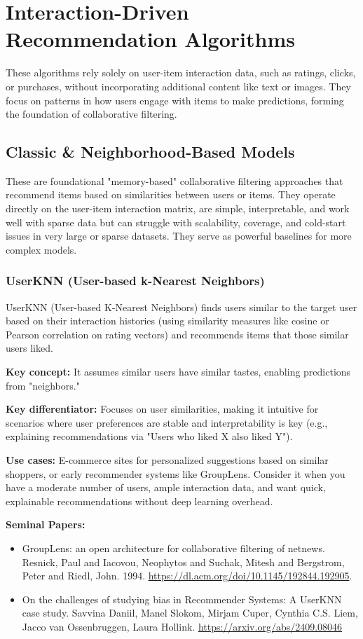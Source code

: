 \documentclass{article}
\begin{document}
    \section{Interaction-Driven Recommendation Algorithms}
    These algorithms rely solely on user-item interaction data, such as ratings, clicks, or purchases, without incorporating additional content like text or images. They focus on patterns in how users engage with items to make predictions, forming the foundation of collaborative filtering.

    \subsection{Classic \& Neighborhood-Based Models}
    These are foundational "memory-based" collaborative filtering approaches that recommend items based on similarities between users or items. They operate directly on the user-item interaction matrix, are simple, interpretable, and work well with sparse data but can struggle with scalability, coverage, and cold-start issues in very large or sparse datasets. They serve as powerful baselines for more complex models.

    \subsubsection{UserKNN (User-based k-Nearest Neighbors)}
    UserKNN (User-based K-Nearest Neighbors) finds users similar to the target user based on their interaction histories (using similarity measures like cosine or Pearson correlation on rating vectors) and recommends items that those similar users liked. 

\noindent\textbf{Key concept:} It assumes similar users have similar tastes, enabling predictions from "neighbors." 

\noindent\textbf{Key differentiator:} Focuses on user similarities, making it intuitive for scenarios where user preferences are stable and interpretability is key (e.g., explaining recommendations via "Users who liked X also liked Y"). 

\noindent\textbf{Use cases:} E-commerce sites for personalized suggestions based on similar shoppers, or early recommender systems like GroupLens. Consider it when you have a moderate number of users, ample interaction data, and want quick, explainable recommendations without deep learning overhead.

\noindent\textbf{Seminal Papers:}
    \begin{itemize}
        \item GroupLens: an open architecture for collaborative filtering of netnews. Resnick, Paul and Iacovou, Neophytos and Suchak, Mitesh and Bergstrom, Peter and Riedl, John. 1994. \url{https://dl.acm.org/doi/10.1145/192844.192905}.
        \item On the challenges of studying bias in Recommender Systems: A UserKNN case study. Savvina Daniil, Manel Slokom, Mirjam Cuper, Cynthia C.S. Liem, Jacco van Ossenbruggen, Laura Hollink. \url{https://arxiv.org/abs/2409.08046}
    \end{itemize}
\end{document}

